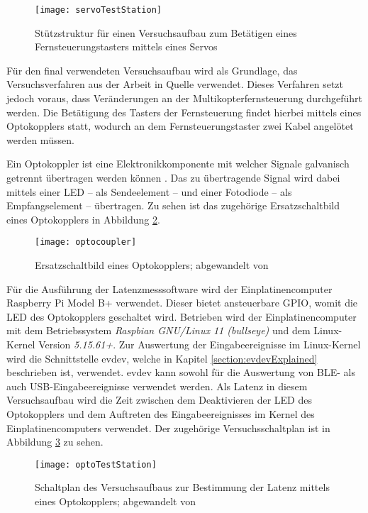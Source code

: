 \begin{figure}[H]
    \centering
    \texttt{[image: servoTestStation]}
    \caption{Stützstruktur für einen Versuchsaufbau zum Betätigen eines Fernsteuerungstasters mittels eines Servos}
    \label{fig:servoTestStation}
\end{figure}

Für den final verwendeten Versuchsaufbau wird als Grundlage, das Versuchsverfahren aus der Arbeit in Quelle \cite{wimmerLatenzStation} verwendet. Dieses Verfahren setzt jedoch voraus, dass Veränderungen an der Multikopterfernsteuerung durchgeführt werden. Die Betätigung des Tasters der Fernsteuerung findet hierbei mittels eines Optokopplers statt, wodurch an dem Fernsteuerungstaster zwei Kabel angelötet werden müssen.

Ein Optokoppler ist eine Elektronikkomponente mit welcher Signale galvanisch getrennt übertragen werden können \cite{elektronikKompendiumOptokoppler}. Das zu übertragende Signal wird dabei mittels einer \acs{LED} -- als Sendeelement -- und einer Fotodiode -- als Empfangselement -- übertragen. Zu sehen ist das zugehörige Ersatzschaltbild eines Optokopplers in Abbildung \ref{fig:optocoupler}.

\begin{figure}[H]
    \centering
    \texttt{[image: optocoupler]}
    \caption{Ersatzschaltbild eines Optokopplers; abgewandelt von \cite{altiumOptokoppler}}
    \label{fig:optocoupler}
\end{figure}

Für die Ausführung der Latenzmesssoftware wird der Einplatinencomputer Raspberry Pi Model B+ verwendet. Dieser bietet ansteuerbare \acs{GPIO}, womit die \acs{LED} des Optokopplers geschaltet wird. Betrieben wird der Einplatinencomputer mit dem Betriebssystem \textit{Raspbian GNU/Linux 11 (bullseye)} und dem Linux-Kernel Version \textit{5.15.61+}. Zur Auswertung der Eingabeereignisse im Linux-Kernel wird die Schnittstelle evdev, welche in Kapitel \ref{section:evdevExplained} beschrieben ist, verwendet. evdev kann sowohl für die Auswertung von \ac{BLE}- als auch USB-Eingabeereignisse verwendet werden. Als Latenz in diesem Versuchsaufbau wird die Zeit zwischen dem Deaktivieren der \acs{LED} des Optokopplers und dem Auftreten des Eingabeereignisses im Kernel des Einplatinencomputers verwendet. Der zugehörige Versuchsschaltplan ist in Abbildung \ref{fig:optoTestStation} zu sehen.

\begin{figure}[H]
    \centering
    \texttt{[image: optoTestStation]}
    \caption{Schaltplan des Versuchsaufbaus zur Bestimmung der Latenz mittels eines Optokopplers; abgewandelt von \cites{wimmerLatenzStation}[S.~8; S.~12]{LTV817}}
    \label{fig:optoTestStation}
\end{figure}

